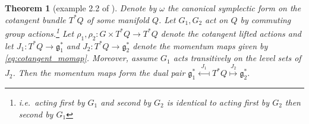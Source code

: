 \documentclass[12pt]{amsart}
\newtheorem{thm}{Theorem}[section]
\begin{document}
  \begin{thm}[example 2.2 of \cite{GayBalmazVizman2012}] \label{thm:commuting_actions}
    Denote by $\omega$ the canonical symplectic form on the cotangent bundle $T^*Q$ of some manifold $Q$.
    Let $G_1,G_2$ act on $Q$
    by commuting group actions.\footnote{i.e.\ acting first by $G_1$ and second by $G_2$ is identical to acting first by $G_2$ then second by $G_1$}
    Let
    $\rho_1,\rho_2: G \times T^*Q \to T^*Q$ denote the cotangent lifted actions
    and let $J_1: T^*Q \to \mathfrak{g}_1^*$ and $J_2: T^*Q \to \mathfrak{g}_2^*$ denote the momentum maps given by \eqref{eq:cotangent_momap}. 
    Moreover, assume $G_1$ acts transitively on the level sets of $J_2$.
    Then the momentum maps form the dual pair
    $
      \mathfrak{g}^*_1
      \stackrel{J_1}{\longmapsfrom}
      T^*Q
      \stackrel{J_2}{\longmapsto}
      \mathfrak{g}_2^*.
    $
  \end{thm}
\end{document}
